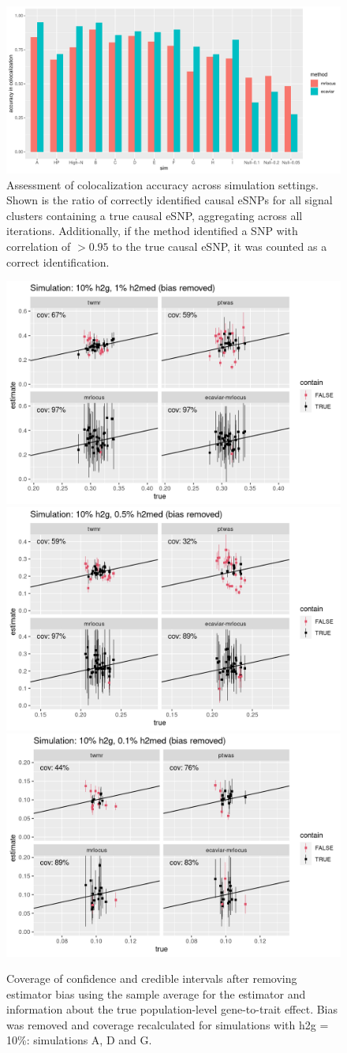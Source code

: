 \documentclass[11pt]{article}
\begin{document}
\begin{figure}[!ht]
  \centering
  \includegraphics[width=.9\textwidth]{figs/assess_coloc}
  \caption{Assessment of colocalization accuracy across simulation
    settings. Shown is the ratio of correctly identified causal eSNPs
    for all signal clusters containing a true causal eSNP, aggregating
    across all iterations. Additionally, if the method identified a
    SNP with correlation of $> 0.95$ to the true causal eSNP, it was
    counted as a correct identification.}
\end{figure}

\begin{figure}[!ht]
  \centering
  \includegraphics[width=.49\textwidth]{figs/cover1_minus_bias.png} 
  \includegraphics[width=.49\textwidth]{figs/cover4_minus_bias.png} \\
  \includegraphics[width=.49\textwidth]{figs/cover5_minus_bias.png}
  \caption{Coverage of confidence and credible intervals after
    removing estimator bias using the sample average for the estimator
    and information about the true population-level gene-to-trait
    effect. Bias was removed and coverage recalculated for simulations
    with h2g = 10\%: simulations A, D and G.}
\end{figure}
\end{document}
